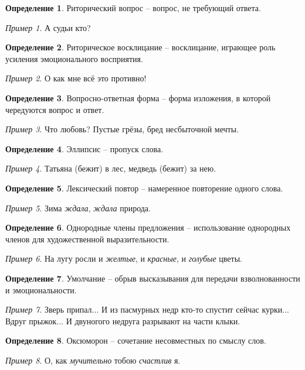 \documentclass[12pt]{article}
\theoremstyle{definition}
\newtheorem{definition}{Определение}
\theoremstyle{remark}
\newtheorem*{example}{Пример}
\begin{document}
\begin{definition}
    Риторический вопрос -- вопрос, не требующий ответа.
    \begin{example}
        А судьи кто?
    \end{example}
\end{definition}
\begin{definition}
    Риторическое восклицание -- восклицание, играющее роль усиления эмоционального восприятия.
    \begin{example}
        О как мне всё это противно!
    \end{example}
\end{definition}
\begin{definition}
    Вопросно-ответная форма -- форма изложения, в которой чередуются вопрос и ответ.
    \begin{example}
        Что любовь? Пустые грёзы, бред несбыточной мечты.
    \end{example}
\end{definition}
\begin{definition}
    Эллипсис -- пропуск слова.
    \begin{example}
        Татьяна (бежит) в лес, медведь (бежит) за нею.
    \end{example}
\end{definition}
\begin{definition}
    Лексический повтор -- намеренное повторение одного слова.
    \begin{example}
        Зима \textsl{ждала}, \textsl{ждала} природа.
    \end{example}
\end{definition}
\begin{definition}
    Однородные члены предложения -- использование однородных членов для художественной выразительности.
    \begin{example}
        На лугу росли и \textsl{желтые}, и \textsl{красные}, и \textsl{голубые} цветы.
    \end{example}
\end{definition}
\begin{definition}
    Умолчание -- обрыв высказывания для передачи взволнованности и эмоциональности.
    \begin{example}
        Зверь припал... И из пасмурных недр кто-то спустит сейчас курки... Вдруг прыжок... И двуногого недруга разрывают на части клыки.
    \end{example}
\end{definition}
\begin{definition}
    Оксюморон -- сочетание несовместных по смыслу слов.
    \begin{example}
        О, как \textsl{мучительно} тобою \textsl{счастлив} я.
    \end{example}
\end{definition}
\end{document}
